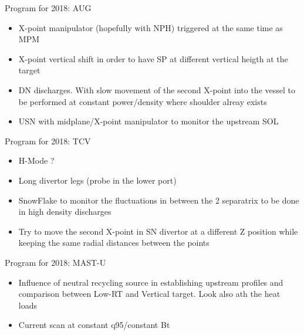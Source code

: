 \documentclass[10pt, compress]{beamer}
\begin{document}
\begin{frame}{Program for 2018: AUG}
  \begin{itemize}
     \item X-point manipulator (hopefully with NPH) triggered at
	the same time as MPM
     \item X-point vertical shift in order to have SP at different
	vertical heigth at the target
     \item DN discharges. With slow movement of the second X-point into the vessel
	to be performed at constant power/density where shoulder alreay exists
     \item USN with midplane/X-point manipulator to monitor the upstream SOL  \end{itemize}
\end{frame}

\begin{frame}{Program for 2018: TCV}
  \begin{itemize}
     \item H-Mode ?
      \item Long divertor legs (probe in the lower port)
      \item SnowFlake to monitor the fluctuations in between the 2 separatrix
	to be done in high density discharges
       \item Try to move the second X-point in SN divertor at a different
	Z position while keeping the same radial distances between the
	points
\end{itemize}
\end{frame}

\begin{frame}{Program for 2018: MAST-U}
  \begin{itemize}
     \item Influence of neutral recycling source in establishing upstream profiles
	and comparison between Low-RT and Vertical target. Look also ath the heat
	loads
      \item Current scan at constant q95/constant Bt
      \end{itemize}
\end{frame}

\end{document}
